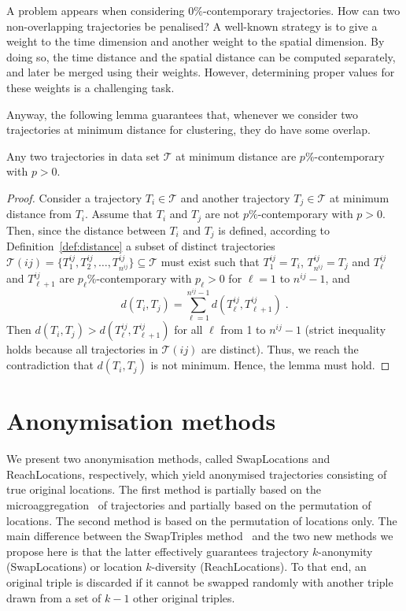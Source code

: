 A problem appears when considering $0\%$-contemporary trajectories.
How can two non-overlapping trajectories be penalised?
A well-known strategy is to give a weight to the time dimension
and another weight to the spatial dimension. By doing so,
the time distance and the spatial distance can be computed separately,
and later be merged using their weights. However, determining
proper values for these weights is a challenging task.

Anyway, the following lemma guarantees that, whenever
we consider two trajectories at minimum distance
for clustering, they do have some overlap.

\begin{lemma}
Any two trajectories in data set $\mathcal{T}$ at minimum distance are
$p\%$-contemporary with $p>0$.
\end{lemma}

\begin{proof} 
Consider a trajectory $T_i \in \mathcal{T}$ and another trajectory
$T_j \in \mathcal{T}$ at minimum distance from $T_i$.
Assume that $T_i$ and $T_j$ are not $p\%$-contemporary with $p>0$.
Then, since the distance
between $T_i$ and $T_j$ is defined, according to
Definition~\ref{def:distance} a subset of distinct trajectories
$\mathcal{T}(ij)=\{T^{ij}_1, T^{ij}_2, \ldots,T^{ij}_{n^{ij}} \} \subseteq \mathcal{T}$
must exist such that $T^{ij}_1=T_i$, $T^{ij}_{n^{ij}}=T_j$
and $T^{ij}_\ell$ and $T^{ij}_{\ell+1}$ are $p_\ell$\%-contemporary
with $p_\ell>0$ for $\ell=1$ to $n^{ij}-1$, and
\[ d(T_i,T_j) =\sum_{\ell=1}^{n^{ij}-1}
d(T^{ij}_\ell, T^{ij}_{\ell +1})\; .  \]
Then $d(T_i,T_j) > d(T^{ij}_\ell, T^{ij}_{\ell +1})$ for all
$\ell$ from 1 to $n^{ij}-1$ (strict inequality holds because
all trajectories in $\mathcal{T}(ij)$ are distinct). Thus,
we reach the contradiction that $d(T_i,T_j)$ is not minimum.
Hence, the lemma must hold.
\end{proof}




\section{Anonymisation methods} \label{sec:anonymisation}

We present two anonymisation methods,
called SwapLocations and ReachLocations, respectively, which yield anonymised trajectories consisting of true original locations.
The first method is
partially based on the microaggregation~\cite{domingo02}
of trajectories and partially based
on the permutation of locations.
The second method is based on the permutation of locations only.
The main difference between
the SwapTriples method~\cite{domingo10springl}
and the two new methods we propose here is that the latter
effectively guarantees trajectory $k$-anonymity (SwapLocations)
or location $k$-diversity (ReachLocations).
To that end, an original
triple is discarded if it cannot be swapped randomly with
another triple drawn from a set of $k-1$ other original triples.

